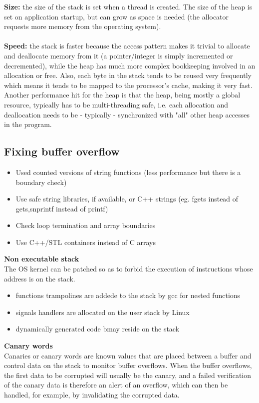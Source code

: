 \documentclass[10pt,a4paper]{book}
\begin{document}
\textbf{Size:} the size of the stack is set when a thread is created. The size of the heap is set on application startup, but can grow as space is needed (the allocator requests more memory from the operating system).\\\\
\textbf{Speed:} the stack is faster because the access pattern makes it trivial to allocate and deallocate memory from it (a pointer/integer is simply incremented or decremented), while the heap has much more complex bookkeeping involved in an allocation or free. Also, each byte in the stack tends to be reused very frequently which means it tends to be mapped to the processor's cache, making it very fast. Another performance hit for the heap is that the heap, being mostly a global resource, typically has to be multi-threading safe, i.e. each allocation and deallocation needs to be - typically - synchronized with "all" other heap accesses in the program.

\subsection{Fixing buffer overflow}
\begin{itemize}
\item Used counted versions of string functions (less performance but there is a boundary check)
\item Use safe string libraries, if available, or C++ strings (eg. fgets instead of gets,snprintf instead of printf)
\item Check loop termination and array boundaries
\item Use C++/STL containers instead of C arrays
\end{itemize}
\textbf{Non executable stack}\\
The OS kernel can be patched so as to forbid the execution of instructions whose address is on the stack.
\begin{itemize}
\item functions trampolines are addede to the stack by gcc for nested functions
\item signals handlers are allocated on the user stack by Linux
\item dynamically generated code bmay reside on the stack
\end{itemize}
\textbf{Canary words}\\
Canaries or canary words are known values that are placed between a buffer and control data on the stack to monitor buffer overflows. When the buffer overflows, the first data to be corrupted will usually be the canary, and a failed verification of the canary data is therefore an alert of an overflow, which can then be handled, for example, by invalidating the corrupted data.
\end{document}
